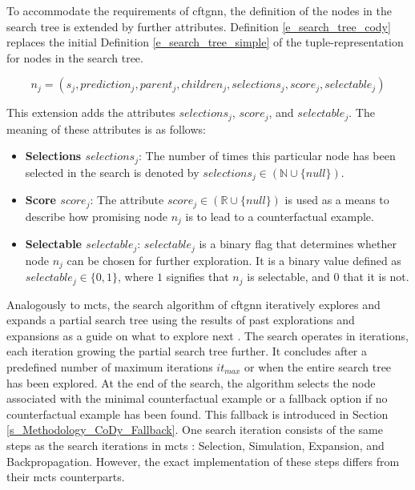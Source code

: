 To accommodate the requirements of \gls{cftgnn}, the definition of the nodes in the search tree is extended by further attributes. Definition \ref{e_search_tree_cody} replaces the initial Definition \ref{e_search_tree_simple} of the tuple-representation for nodes in the search tree.

\begin{equation}
    \label{e_search_tree_cody}
    n_j = (s_j, prediction_j, parent_j, children_j, selections_j, score_j, selectable_j)
\end{equation}

This extension adds the attributes $selections_j$, $score_j$, and $selectable_j$. The meaning of these attributes is as follows:

\begin{itemize}
    \item \textbf{Selections $selections_j$}: The number of times this particular node has been selected in the search is denoted by $selections_j \in (\mathbb{N} \cup \{null\})$.

    \item \textbf{Score $score_j$}: The attribute $score_j \in (\mathbb{R} \cup \{null\})$ is used as a means to describe how promising node $n_j$ is to lead to a counterfactual example.

    \item \textbf{Selectable $selectable_j$}: $selectable_j$ is a binary flag that determines whether node $n_j$ can be chosen for further exploration. It is a binary value defined as $selectable_j \in \{0, 1\}$, where $1$ signifies that $n_j$ is selectable, and $0$ that it is not.
\end{itemize}


Analogously to \gls{mcts}, the search algorithm of \gls{cftgnn} iteratively explores and expands a partial search tree using the results of past explorations and expansions as a guide on what to explore next \cite{browne_survey_2012}. The search operates in iterations, each iteration growing the partial search tree further. It concludes after a predefined number of maximum iterations $it_{max}$ or when the entire search tree has been explored. At the end of the search, the algorithm selects the node associated with the minimal counterfactual example or a fallback option if no counterfactual example has been found. This fallback is introduced in Section \ref{s_Methodology_CoDy_Fallback}. One search iteration consists of the same steps as the search iterations in \gls{mcts} \cite{browne_survey_2012}: Selection, Simulation, Expansion, and Backpropagation. However, the exact implementation of these steps differs from their \gls{mcts} counterparts.

